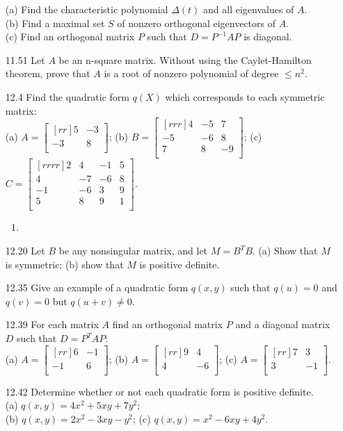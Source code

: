 \documentclass[12pt]{article}
\theoremstyle{plain}
\theoremstyle{definition}
\theoremstyle{plain}
\begin{document}
\begin{enumerate}
(a) Find the characteristic polynomial $\Delta(t)$ and all eigenvalues of $A$.\\
(b) Find a maximal set $S$ of nonzero orthogonal eigenvectors of $A$.\\
(c) Find an orthogonal matrix $P$ such that $D=P^{-1}AP$ is diagonal.
\item[11.51]Let $A$ be an n-square matrix. Without using the Caylet-Hamilton theorem, prove that $A$ is a root of nonzero polynomial of degree $\leq n^2$.
\item[12.4]Find the quadratic form $q(X)$ which corresponds to each symmetric matrix:\\
(a) $A=\begin{bmatrix}[rr]5&-3\\-3&8\\\end{bmatrix}$; (b) $B=\begin{bmatrix}[rrr]4&-5&7\\-5&-6&8\\7&8&-9\\\end{bmatrix}$; (c) $C=\begin{bmatrix}[rrrr]2&4&-1&5\\4&-7&-6&8\\-1&-6&3&9\\5&8&9&1\\\end{bmatrix}$.
	\begin{enumerate}
	\item
	\end{enumerate}
\item[12.20]Let $B$ be any nonsingular matrix, and let $M=B^TB$. (a) Show that $M$ is symmetric; (b) show that $M$ is positive definite.
\item[12.35]Give an example of a quadratic form $q(x,y)$ such that $q(u)=0$ and $q(v)=0$ but $q(u+v)\neq 0$.
\item[12.39]For each matrix $A$ find an orthogonal matrix $P$ and a diagonal matrix $D$ such that $D=P^TAP$:\\
(a) $A=\begin{bmatrix}[rr]6&-1\\-1&6\\\end{bmatrix}$; (b) $A=\begin{bmatrix}[rr]9&4\\4&-6\\\end{bmatrix}$; (c) $A=\begin{bmatrix}[rr]7&3\\3&-1\\\end{bmatrix}$.
\item[12.42]Determine whether or not each quadratic form is positive definite.\\
(a) $q(x,y) = 4x^2+5xy+7y^2$;\\
(b) $q(x,y)=2x^2-3xy-y^2$; (c) $q(x,y)=x^2-6xy+4y^2$.
\end{enumerate}
\end{document}
